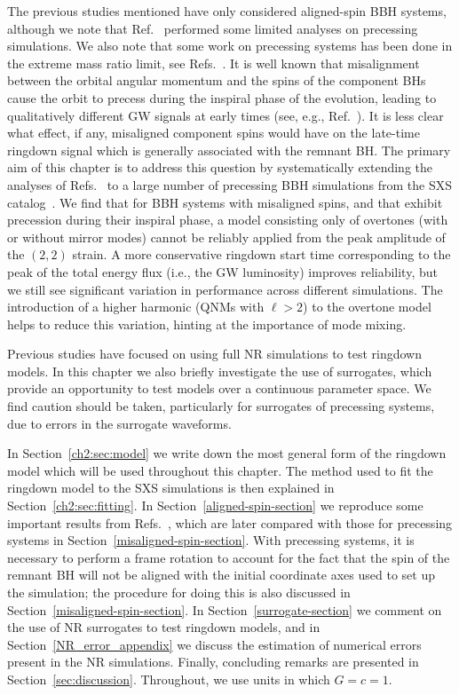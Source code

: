 The previous studies mentioned have only considered aligned-spin BBH systems, although we note that Ref.~\cite{Kamaretsos:2012bs} performed some limited analyses on precessing simulations.
We also note that some work on precessing systems has been done in the extreme mass ratio limit, see Refs.~\cite{Hughes:2019zmt,Lim:2019xrb,Lim:2022veo}.
It is well known that misalignment between the orbital angular momentum and the spins of the component BHs cause the orbit to precess during the inspiral phase of the evolution, leading to qualitatively different GW signals at early times (see, e.g., Ref.~\cite{Apostolatos:1994mx}). 
It is less clear what effect, if any, misaligned component spins would have on the late-time ringdown signal which is generally associated with the remnant BH. 
The primary aim of this chapter is to address this question by systematically extending the analyses of Refs.~\cite{Giesler:2019uxc, Dhani:2020nik} to a large number of precessing BBH simulations from the SXS catalog~\cite{Boyle:2019kee}. 
We find that for BBH systems with misaligned spins, and that exhibit precession during their inspiral phase, a model consisting only of overtones (with or without mirror modes) cannot be reliably applied from the peak amplitude of the $(2,2)$ strain. 
A more conservative ringdown start time corresponding to the peak of the total energy flux (i.e., the GW luminosity) improves reliability, but we still see significant variation in performance across different simulations. 
The introduction of a higher harmonic (QNMs with $\ell > 2$) to the overtone model helps to reduce this variation, hinting at the importance of mode mixing.

Previous studies have focused on using full NR simulations to test ringdown models. 
In this chapter we also briefly investigate the use of surrogates, which provide an opportunity to test models over a continuous parameter space. 
We find caution should be taken, particularly for surrogates of precessing systems, due to errors in the surrogate waveforms.

In Section~\ref{ch2:sec:model} we write down the most general form of the ringdown model which will be used throughout this chapter.
The method used to fit the ringdown model to the SXS simulations is then explained in Section~\ref{ch2:sec:fitting}.
In Section~\ref{aligned-spin-section} we reproduce some important results from Refs.~\cite{Giesler:2019uxc, Dhani:2020nik}, which are later compared with those for precessing systems in Section~\ref{misaligned-spin-section}. 
With precessing systems, it is necessary to perform a frame rotation to account for the fact that the spin of the remnant BH will not be aligned with the initial coordinate axes used to set up the simulation; the procedure for doing this is also discussed in Section~\ref{misaligned-spin-section}. 
In Section~\ref{surrogate-section} we comment on the use of NR surrogates to test ringdown models, and in Section~\ref{NR_error_appendix} we discuss the estimation of numerical errors present in the NR simulations.
Finally, concluding remarks are presented in Section~\ref{sec:discussion}. 
Throughout, we use units in which $G=c=1$.

